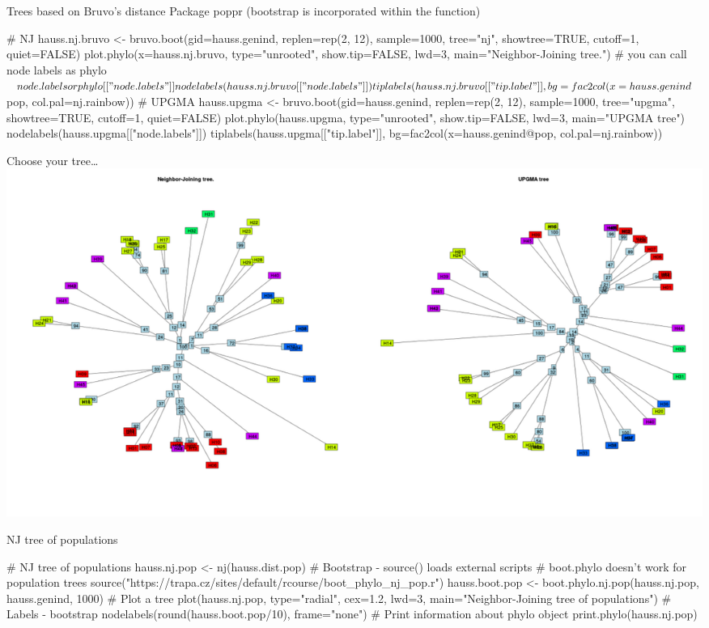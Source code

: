 \documentclass[compress, ucs, xelatex, 11pt, xcolor=svgnames,
  hyperref={
    bookmarks=true,
    unicode=true,
    colorlinks=true,
    pdftitle={Molecular data in R},
    plainpages=false,
    pdfauthor={Vojtech Zeisek},
    pdfsubject={Course about phylogeny and evolution in R},
    pdfcreator={XeLaTeX},
    pdfkeywords={R, evolution, phylogeny, molecular data},
    linkcolor=Tomato,
    anchorcolor=SaddleBrown,
    citecolor=Goldenrod,
    filecolor=DarkMagenta,
    menucolor=Sienna,
    urlcolor=DarkTurquoise,
    pdftex},
  url={hyphens, lowtilde} %
  ]{beamer}
\begin{document}
\begin{frame}[fragile]{Trees based on Bruvo's distance}
Package poppr (bootstrap is incorporated within the function)
  \begin{spluscode}
    # NJ
    hauss.nj.bruvo <- bruvo.boot(gid=hauss.genind, replen=rep(2, 12),
      sample=1000, tree="nj", showtree=TRUE, cutoff=1, quiet=FALSE)
    plot.phylo(x=hauss.nj.bruvo, type="unrooted", show.tip=FALSE,
      lwd=3, main="Neighbor-Joining tree.")
    # you can call node labels as phylo$node.labels or phylo[["node.labels"]]
    nodelabels(hauss.nj.bruvo[["node.labels"]]) 
    tiplabels(hauss.nj.bruvo[["tip.label"]], bg=fac2col(x=hauss.genind$pop,
      col.pal=nj.rainbow))
    # UPGMA
    hauss.upgma <- bruvo.boot(gid=hauss.genind, replen=rep(2, 12),
      sample=1000, tree="upgma", showtree=TRUE, cutoff=1, quiet=FALSE)
    plot.phylo(hauss.upgma, type="unrooted", show.tip=FALSE, lwd=3,
      main="UPGMA tree")
    nodelabels(hauss.upgma[["node.labels"]])
    tiplabels(hauss.upgma[["tip.label"]], bg=fac2col(x=hauss.genind@pop,
      col.pal=nj.rainbow))
  \end{spluscode}
\end{frame}

\begin{frame}{Choose your tree\ldots}
\includegraphics[width=\textwidth]{nj-upgma-bruvo.png}
\end{frame}

\begin{frame}[fragile]{NJ tree of populations}
  \begin{spluscode}
    # NJ tree of populations
    hauss.nj.pop <- nj(hauss.dist.pop)
    # Bootstrap - source() loads external scripts
    # boot.phylo doesn't work for population trees
    source("https://trapa.cz/sites/default/rcourse/boot_phylo_nj_pop.r")
    hauss.boot.pop <- boot.phylo.nj.pop(hauss.nj.pop, hauss.genind, 1000)
    # Plot a tree
    plot(hauss.nj.pop, type="radial", cex=1.2, lwd=3,
      main="Neighbor-Joining tree of populations")
    # Labels - bootstrap
    nodelabels(round(hauss.boot.pop/10), frame="none")
    # Print information about phylo object
    print.phylo(hauss.nj.pop)
  \end{spluscode}
\end{frame}
\end{document}
